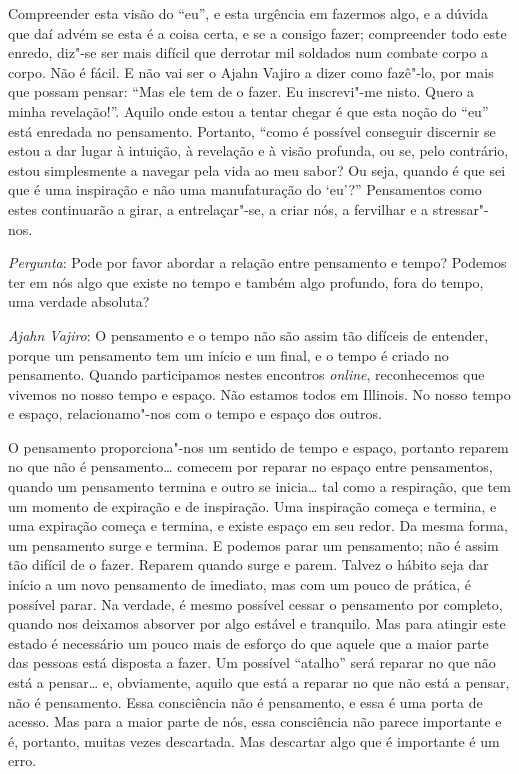 Compreender esta visão do ``eu'', e esta urgência em fazermos algo, e a dúvida
que daí advém se esta é a coisa certa, e se a consigo fazer; compreender todo
este enredo, diz"-se ser mais difícil que derrotar mil soldados num combate corpo
a corpo. Não é fácil. E não vai ser o Ajahn Vajiro a dizer como fazê"-lo, por
mais que possam pensar: ``Mas ele tem de o fazer. Eu inscrevi"-me nisto. Quero a
minha revelação!''. Aquilo onde estou a tentar chegar é que esta noção do ``eu''
está enredada no pensamento. Portanto, ``como é possível conseguir discernir se
estou a dar lugar à intuição, à revelação e à visão profunda, ou se, pelo
contrário, estou simplesmente a navegar pela vida ao meu sabor? Ou seja, quando
é que sei que é uma inspiração e não uma manufaturação do `eu'?'' Pensamentos
como estes continuarão a girar, a entrelaçar"-se, a criar nós, a fervilhar e a
stressar"-nos.

\bigskip

\emph{Pergunta}: Pode por favor abordar a relação entre pensamento e tempo?
Podemos ter em nós algo que existe no tempo e também algo profundo, fora do
tempo, uma verdade absoluta?

\enlargethispage{\baselineskip}

\emph{Ajahn Vajiro}: O pensamento e o tempo não são assim tão difíceis de
entender, porque um pensamento tem um início e um final, e o tempo é criado no
pensamento. Quando participamos nestes encontros \emph{online}, reconhecemos que
vivemos no nosso tempo e espaço. Não estamos todos em Illinois. No nosso tempo e
espaço, relacionamo"-nos com o tempo e espaço dos outros.

O pensamento proporciona"-nos um sentido de tempo e espaço, portanto reparem no
que não é pensamento\ldots{} comecem por reparar no espaço entre pensamentos,
quando um pensamento termina e outro se inicia\ldots{} tal como a respiração,
que tem um momento de expiração e de inspiração. Uma inspiração começa e
termina, e uma expiração começa e termina, e existe espaço em seu redor. Da
mesma forma, um pensamento surge e termina. E podemos parar um pensamento; não é
assim tão difícil de o fazer. Reparem quando surge e parem. Talvez o hábito seja
dar início a um novo pensamento de imediato, mas com um pouco de prática, é
possível parar. Na verdade, é mesmo possível cessar o pensamento por completo,
quando nos deixamos absorver por algo estável e tranquilo. Mas para atingir este
estado é necessário um pouco mais de esforço do que aquele que a maior parte das
pessoas está disposta a fazer. Um possível ``atalho'' será reparar no que não
está a pensar\ldots{} e, obviamente, aquilo que está a reparar no que não está a
pensar, não é pensamento. Essa consciência não é pensamento, e essa é uma porta
de acesso. Mas para a maior parte de nós, essa consciência não parece importante
e é, portanto, muitas vezes descartada. Mas descartar algo que é importante é um
erro.

